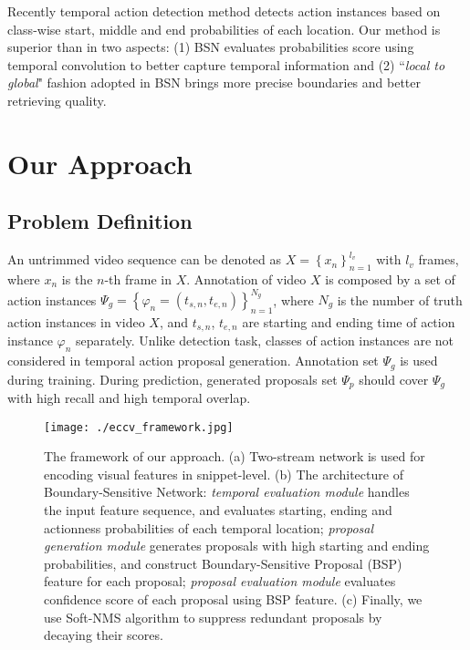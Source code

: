 \documentclass[runningheads]{llncs}
\begin{document}
Recently temporal action detection method \cite{yuan2017temporal} detects action instances based on class-wise start, middle and end probabilities of each location. Our method is superior than \cite{yuan2017temporal} in two aspects: (1) BSN evaluates probabilities score using temporal convolution to better capture temporal information  and (2) ``\emph{local to global}" fashion adopted in BSN brings more precise boundaries and better retrieving quality.



\section{Our Approach}

\subsection{Problem Definition}


An untrimmed video sequence can be denoted as $X=\left \{ x_n \right \}_{n=1}^{l_v}$ with $l_v$  frames, where $x_n$ is the $n$-th frame in $X$.
Annotation of video $X$ is composed by a set of action instances $\Psi_g  = \left \{ \varphi  _n=\left (t_{s,n},t_{e,n}   \right ) \right \}_{n=1}^{N_g}$, where $N_g$ is the number of truth action instances in video  $X$, and $t_{s,n}$, $t_{e,n} $ are starting and ending time of action instance $\varphi_n$ separately.
Unlike  detection task, classes of action instances are not considered in temporal action proposal generation.
Annotation set $\Psi_g$ is used during training. During prediction, generated proposals set $\Psi_p$ should cover $\Psi_g$ with high recall and high temporal overlap.

\begin{figure*}%
\setlength{\abovecaptionskip}{-0.4cm} %
\setlength{\belowcaptionskip}{-0.5cm} %
\begin{center}
\begin{minipage}[b]{1.0\linewidth}
  \centering
  \centerline{\texttt{[image: ./eccv\_framework.jpg]}}
  \medskip
\end{minipage}
\end{center}
   \caption{The framework of our approach. (a) Two-stream network is used for encoding visual features in snippet-level. (b) The architecture of Boundary-Sensitive Network: \emph{temporal evaluation module} handles the input feature sequence, and evaluates starting, ending  and actionness probabilities of each temporal location; \emph{proposal generation module} generates proposals with high starting and ending probabilities, and construct Boundary-Sensitive Proposal (BSP) feature for each proposal; \emph{proposal evaluation module} evaluates confidence score of each proposal using BSP feature. (c) Finally, we use Soft-NMS algorithm  to suppress redundant proposals by decaying their scores. }
\label{fig_framework}
\end{figure*}
\end{document}

